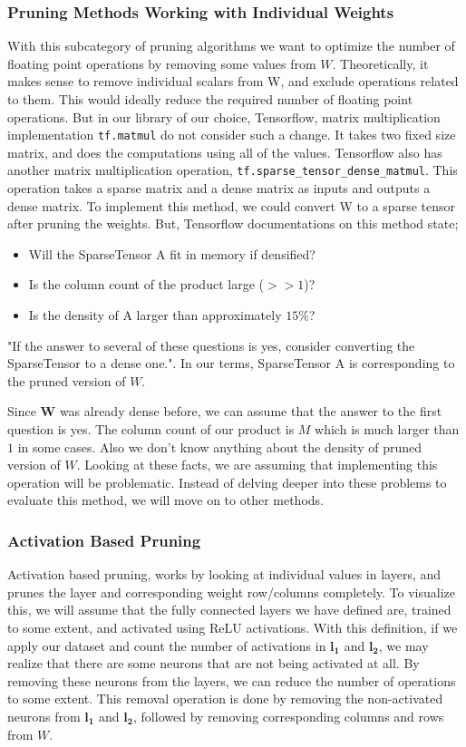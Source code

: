 \documentclass[a4paper,man,natbib]{apa6}
\begin{document}
\subsubsection{Pruning Methods Working with Individual Weights}
With this subcategory of pruning algorithms we want to optimize the number of floating point operations by removing some values from $W$. Theoretically, it makes sense to remove individual scalars from W, and exclude operations related to them. This would ideally reduce the required number of floating point operations. But in our library of our choice, Tensorflow, matrix multiplication implementation \texttt{tf.matmul} do not consider such a change. It takes two fixed size matrix, and does the computations using all of the values. Tensorflow also has another matrix multiplication operation, \texttt{tf.sparse\_tensor\_dense\_matmul}. This operation takes a sparse matrix and a dense matrix as inputs and outputs a dense matrix. To implement this method, we could convert W to a sparse tensor after pruning the weights. But, Tensorflow documentations on this method state;
\begin{itemize}
\item Will the SparseTensor A fit in memory if densified?
\item Is the column count of the product large ($>> 1$)?
\item Is the density of A larger than approximately $15\%$?
\end{itemize}
"If the answer to several of these questions is yes, consider converting the SparseTensor to a dense one.". In our terms, SparseTensor A is corresponding to the pruned version of $W$. 

Since $\mathbf{W}$ was already dense before, we can assume that the answer to the first question is yes. The column count of our product is $M$ which is much larger than $1$ in some cases. Also we don't know anything about the density of pruned version of $W$. Looking at these facts, we are assuming that implementing this operation will be problematic. Instead of delving deeper into these problems to evaluate this method, we will move on to other methods.

\subsubsection{Activation Based Pruning}
Activation based pruning, works by looking at individual values in layers, and prunes the layer and corresponding weight row/columns completely. To visualize this, we will assume that the fully connected layers we have defined are, trained to some extent, and activated using ReLU activations. With this definition, if we apply our dataset and count the number of activations in $\mathbf{l_1}$ and $\mathbf{l_2}$, we may realize that there are some neurons that are not being activated at all. By removing these neurons from the layers, we can reduce the number of operations to some extent. This removal operation is done by removing the non-activated neurons from $\mathbf{l_1}$ and $\mathbf{l_2}$, followed by removing corresponding columns and rows from $W$.





\end{document}
